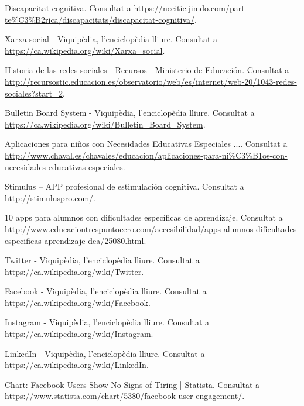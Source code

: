 \documentclass[11pt,catalan,listoffigures,listoftables]{tfgetsinf}
\begin{document}
\begin{thebibliography}{10}

   Discapacitat cognitiva.
   \newblock Consultat a 
   \url{https://neeitic.jimdo.com/part-te\%C3\%B2rica/discapacitats/discapacitat-cognitiva/}.

   Xarxa social - Viquipèdia, l'enciclopèdia lliure.
   \newblock Consultat a 
   \url{https://ca.wikipedia.org/wiki/Xarxa_social}.
   
   Historia de las redes sociales - Recursos - Ministerio de Educación.
   \newblock Consultat a 
   \url{http://recursostic.educacion.es/observatorio/web/es/internet/web-20/1043-redes-sociales?start=2}.

   Bulletin Board System - Viquipèdia, l'enciclopèdia lliure.
   \newblock Consultat a 
   \url{https://ca.wikipedia.org/wiki/Bulletin_Board_System}.

   Aplicaciones para niños con Necesidades Educativas Especiales ....
   \newblock Consultat a 
   \url{http://www.chaval.es/chavales/educacion/aplicaciones-para-ni\%C3\%B1os-con-necesidades-educativas-especiales}.

   Stimulus – APP profesional de estimulación cognitiva.
   \newblock Consultat a 
   \url{http://stimuluspro.com/}.

   10 apps para alumnos con dificultades específicas de aprendizaje.
   \newblock Consultat a 
   \url{http://www.educaciontrespuntocero.com/accesibilidad/apps-alumnos-dificultades-especificas-aprendizaje-dea/25080.html}.

   Twitter - Viquipèdia, l'enciclopèdia lliure.
   \newblock Consultat a 
   \url{https://ca.wikipedia.org/wiki/Twitter}.

   Facebook - Viquipèdia, l'enciclopèdia lliure.
   \newblock Consultat a 
   \url{https://ca.wikipedia.org/wiki/Facebook}.

   Instagram - Viquipèdia, l'enciclopèdia lliure.
   \newblock Consultat a 
   \url{https://ca.wikipedia.org/wiki/Instagram}.

   LinkedIn - Viquipèdia, l'enciclopèdia lliure.
   \newblock Consultat a 
   \url{https://ca.wikipedia.org/wiki/LinkedIn}.
   
   Chart: Facebook Users Show No Signs of Tiring | Statista.
   \newblock Consultat a 
   \url{https://www.statista.com/chart/5380/facebook-user-engagement/}.

\end{thebibliography}
\cleardoublepage


\end{document}
